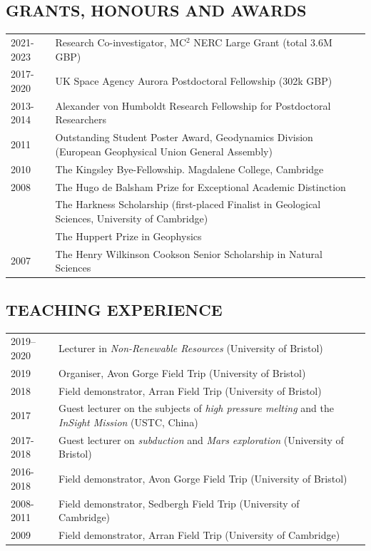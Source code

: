 \documentclass[11pt,twoside,a4paper]{article}
\begin{document}
\subsection*{GRANTS, HONOURS AND AWARDS}

\vspace{-0.5em}
\begin{table}[!h]
\centering
\begin{tabular}{L{2cm} L{13cm} L{2cm}}
2021-2023 & Research Co-investigator, MC$^2$ NERC Large Grant (total 3.6M GBP) & \\
2017-2020 & UK Space Agency Aurora Postdoctoral Fellowship (302k GBP) & \\
2013-2014 & Alexander von Humboldt Research Fellowship for Postdoctoral Researchers & \\
2011 & Outstanding Student Poster Award, Geodynamics Division (European Geophysical Union General Assembly) & \\
2010 & The Kingsley Bye-Fellowship. Magdalene College, Cambridge & \\
2008 & The Hugo de Balsham Prize for Exceptional Academic Distinction & \\
 & The Harkness Scholarship (first-placed Finalist in Geological Sciences, University of Cambridge) & \\
 & The Huppert Prize in Geophysics &  \\
2007 & The Henry Wilkinson Cookson Senior Scholarship in Natural Sciences &
\end{tabular}
\end{table}
\vspace{-1.5em}

\clearpage
\subsection*{TEACHING EXPERIENCE}
\vspace{-0.5em}
\begin{table}[!h]
\centering
\begin{tabular}{L{2cm} L{13cm} L{2cm}}
  2019--2020 & Lecturer in \emph{Non-Renewable Resources} (University of Bristol) & \\
  2019 & Organiser, Avon Gorge Field Trip (University of Bristol) &\\
  2018 & Field demonstrator, Arran Field Trip (University of Bristol) & \\
  2017 \vfill & Guest lecturer on the subjects of \emph{high pressure melting} and the \emph{InSight Mission} (USTC, China) & \\
  2017-2018 & Guest lecturer on \emph{subduction} and \emph{Mars exploration} (University of Bristol) & \\
  2016-2018 & Field demonstrator, Avon Gorge Field Trip (University of Bristol) & \\
  2008-2011 & Field demonstrator, Sedbergh Field Trip (University of Cambridge) & \\
  2009 & Field demonstrator, Arran Field Trip (University of Cambridge) &
\end{tabular}
\end{table}
\vspace{-1.5em}
\end{document}

